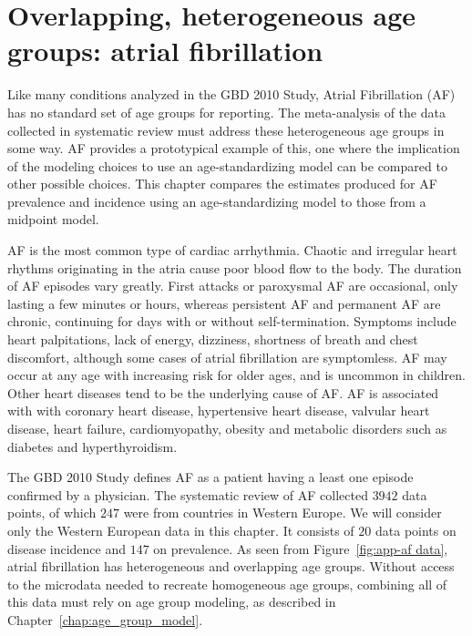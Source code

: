 \chapter{Overlapping, heterogeneous age groups: atrial fibrillation}
\label{applications-age_groups}

Like many conditions analyzed in the GBD 2010 Study, Atrial
Fibrillation (AF) has no standard set of age groups for reporting.  The
meta-analysis of the data collected in systematic review must address
these heterogeneous age groups in some way. AF provides a prototypical
example of this, one where the implication of the modeling choices to
use an age-standardizing model can be compared to other possible
choices.  This chapter compares the estimates produced for AF
prevalence and incidence using an age-standardizing model to those
from a midpoint model.

AF is the most common type of cardiac arrhythmia.  Chaotic and
irregular heart rhythms originating in the atria cause poor blood flow
to the body.  The duration of AF episodes vary greatly.  First attacks
or paroxysmal AF are occasional, only lasting a few minutes or hours,
whereas persistent AF and permanent AF are chronic, continuing for
days with or without self-termination.  Symptoms include
heart palpitations, lack of energy, dizziness, shortness of breath and
chest discomfort, although some cases of atrial fibrillation are
symptomless.  AF may occur at any age with increasing risk for older
ages, and is uncommon in children.  Other heart diseases tend to be
the underlying cause of AF.  AF is associated with with coronary heart
disease, hypertensive heart disease, valvular heart disease, heart
failure, cardiomyopathy, obesity and metabolic disorders such as
diabetes and hyperthyroidism. \cite{rich_epidemiology_2009,
  rho_asymptomatic_2005, fuster_acc/aha/esc_2006, radford_atrial_1977,
  TK_ref_from_Mehrdad}

The GBD 2010 Study defines AF as a patient having a least one episode
confirmed by a physician.  The systematic review of AF collected $3942$
data points, of which $247$ were from countries in Western Europe.  We
will consider only the Western European data in this chapter. It
consists of $20$ data points on disease incidence and $147$ on prevalence.
As seen from Figure~\ref{fig:app-af data}, atrial fibrillation has
heterogeneous and overlapping age groups.  Without access to the
microdata needed to recreate homogeneous age groups, combining all of
this data must rely on age group modeling, as described in
Chapter~\ref{chap:age_group_model}.


